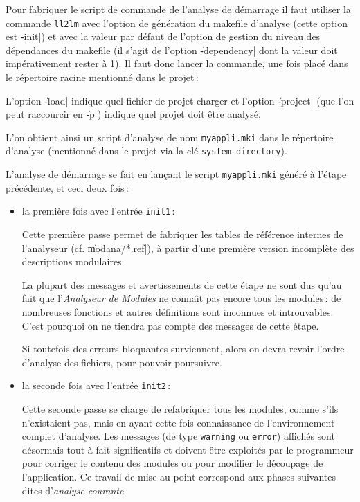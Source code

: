 Pour fabriquer le script de commande de l'analyse de d\'{e}marrage
il faut utiliser la commande {\tt ll2lm} avec l'option
de g\'{e}n\'{e}ration du makefile d'analyse (cette option est \|-init|) 
et avec la valeur par d\'{e}faut de l'option
de gestion du niveau des d\'{e}pendances du makefile
(il s'agit de l'option \|-dependency| dont la valeur
doit imp\'{e}rativement rester \`{a} 1).
Il faut donc lancer la commande, une fois plac\'{e} dans le r\'{e}pertoire
racine mentionn\'{e} dans le projet\,:
\begin{Code*}
\end{Code*}
L'option \|-load| indique quel fichier de projet charger et
l'option \|-project| (que l'on peut raccourcir en \|-p|)
indique quel projet doit \^{e}tre analys\'{e}.

L'on obtient ainsi un script d'analyse de nom {\tt myappli.mki}
dans le r\'{e}pertoire d'analyse (mentionn\'{e} dans le projet via la
cl\'{e} {\tt system-directory}).



L'analyse de d\'{e}marrage se fait en lan\c{c}ant le script 
{\tt myappli.mki} g\'{e}n\'{e}r\'{e} \`{a} l'\'{e}tape pr\'{e}c\'{e}dente, et
ceci deux fois\,:

\begin{itemize}

\item la premi\`{e}re fois avec l'entr\'{e}e {\tt init1}\,:
\begin{Code*}
\end{Code*}
Cette premi\`{e}re passe permet de fabriquer les tables de r\'{e}f\'{e}rence
internes de l'analyseur (cf. \|modana/*.ref|),
\`{a} partir d'une premi\`{e}re version incompl\`{e}te
des descriptions modulaires. 

La plupart des messages et avertissements de cette \'{e}tape ne sont dus
qu'au fait que l'{\em Analyseur de Modules} ne conna\^{\i}t pas encore tous
les modules\,: de nombreuses fonctions et autres d\'{e}finitions sont
inconnues et introuvables. C'est pourquoi on ne tiendra pas compte des
messages de cette \'{e}tape. 

Si toutefois des erreurs bloquantes surviennent,
alors on devra revoir l'ordre d'analyse des fichiers, pour
pouvoir poursuivre.


\item la seconde fois avec l'entr\'{e}e {\tt init2}\,:
\begin{Code*}
\end{Code*}

Cette seconde passe se charge de refabriquer tous les modules, 
comme s'ils n'existaient pas, mais en ayant cette fois connaissance
de l'environnement complet d'analyse.
Les messages (de type {\tt warning} ou {\tt error}) 
affich\'{e}s sont d\'{e}sormais tout \`{a} fait significatifs et doivent \^{e}tre
exploit\'{e}s par le programmeur pour corriger le contenu des modules
ou pour modifier le d\'{e}coupage de l'application.
Ce travail de mise au point correspond aux phases suivantes dites
d'{\em analyse courante}.
\end{itemize}


